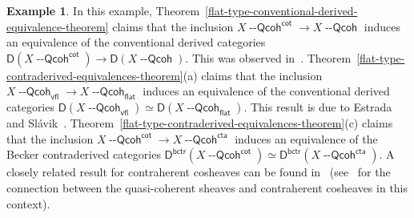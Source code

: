 \documentclass[12pt,a4paper]{amsart}
\newcommand{\+}{\nobreakdash-}
\renewcommand{\:}{\colon}
\newcommand{\rarrow}{\longrightarrow}
\newcommand{\Qcoh}{{\operatorname{\mathsf{--Qcoh}}}}
\newcommand{\sD}{\mathsf D}
\renewcommand{\flat}{\mathsf{flat}}
\renewcommand{\cot}{\mathsf{cot}}
\newcommand{\vfl}{\mathsf{vfl}}
\newcommand{\cta}{\mathsf{cta}}
\newcommand{\bctr}{\mathsf{bctr}}
\theoremstyle{plain}
\theoremstyle{definition}
\newtheorem{ex}[thm]{Example}
\begin{document}
\begin{ex}
 In this example,
Theorem~\ref{flat-type-conventional-derived-equivalence-theorem}
claims that the inclusion $X\Qcoh^\cot\rarrow X\Qcoh$ induces
an equivalence of the conventional derived categories
$\sD(X\Qcoh^\cot)\rarrow\sD(X\Qcoh)$.
 This was observed in~\cite[Corollary~10.7]{PS6}.
 Theorem~\ref{flat-type-contraderived-equivalences-theorem}(a) claims
that the inclusion $X\Qcoh_\vfl\rarrow X\Qcoh_\flat$ induces
an equivalence of the conventional derived categories
$\sD(X\Qcoh_\vfl)\simeq\sD(X\Qcoh_\flat)$.
 This result is due to Estrada and Sl\'avik~\cite[Corollary~6.2]{ES}.
 Theorem~\ref{flat-type-contraderived-equivalences-theorem}(c) claims
that the inclusion $X\Qcoh^\cot\rarrow X\Qcoh^\cta$ induces
an equivalence of the Becker contraderived categories
$\sD^\bctr(X\Qcoh^\cot)\simeq\sD^\bctr(X\Qcoh^\cta)$.
 A closely related result for contraherent cosheaves can be found
in~\cite[Theorem~5.5.10]{Pcosh} (see~\cite[Corollaries~4.7.4(a)
and~4.7.5(a), and Lemmas~4.8.2 and~4.8.4(a)]{Pcosh} for the connection
between the quasi-coherent sheaves and contraherent cosheaves in
this context).
\end{ex}
\end{document}
